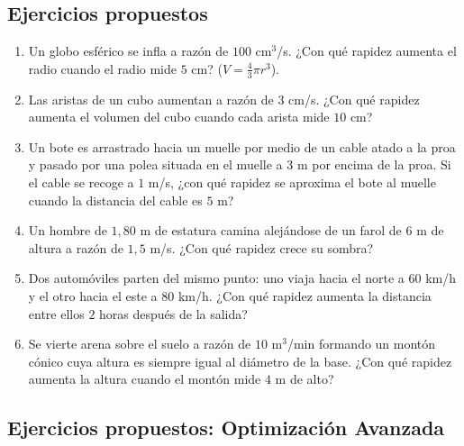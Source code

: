 \documentclass[12pt, letterpaper]{article}
\begin{document}
\subsection{Ejercicios propuestos}

\begin{enumerate}[resume=ejercicios, leftmargin=*]
  \item \facil{} Un globo esférico se infla a razón de $100$ cm$^3$/s. ¿Con qué rapidez aumenta el radio cuando el radio mide $5$ cm? ($V = \frac{4}{3}\pi r^3$).
  \item \facil{} Las aristas de un cubo aumentan a razón de $3$ cm/s. ¿Con qué rapidez aumenta el volumen del cubo cuando cada arista mide $10$ cm?
  \item \medio{} Un bote es arrastrado hacia un muelle por medio de un cable atado a la proa y pasado por una polea situada en el muelle a $3$ m por encima de la proa. Si el cable se recoge a $1$ m/s, ¿con qué rapidez se aproxima el bote al muelle cuando la distancia del cable es $5$ m?
  \item \medio{} Un hombre de $1{,}80$ m de estatura camina alejándose de un farol de $6$ m de altura a razón de $1{,}5$ m/s. ¿Con qué rapidez crece su sombra?
  \item \dificil{} Dos automóviles parten del mismo punto: uno viaja hacia el norte a $60$ km/h y el otro hacia el este a $80$ km/h. ¿Con qué rapidez aumenta la distancia entre ellos $2$ horas después de la salida?
  \item \dificil{} Se vierte arena sobre el suelo a razón de $10$ m$^3$/min formando un montón cónico cuya altura es siempre igual al diámetro de la base. ¿Con qué rapidez aumenta la altura cuando el montón mide $4$ m de alto?
\end{enumerate}



\subsection{Ejercicios propuestos: Optimización Avanzada}
\end{document}
